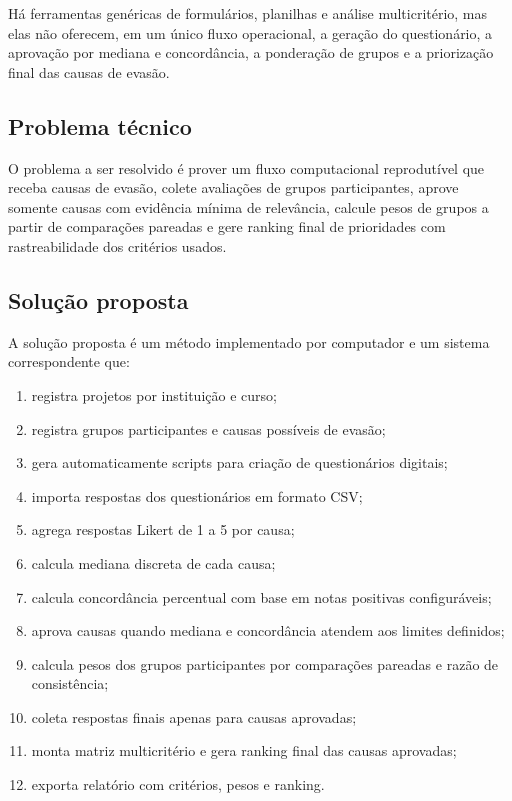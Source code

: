 Há ferramentas genéricas de formulários, planilhas e análise multicritério, mas elas não oferecem, em um único fluxo operacional, a geração do questionário, a aprovação por mediana e concordância, a ponderação de grupos e a priorização final das causas de evasão.

\subsection{Problema técnico}

O problema a ser resolvido é prover um fluxo computacional reprodutível que receba causas de evasão, colete avaliações de grupos participantes, aprove somente causas com evidência mínima de relevância, calcule pesos de grupos a partir de comparações pareadas e gere ranking final de prioridades com rastreabilidade dos critérios usados.

\subsection{Solução proposta}

A solução proposta é um método implementado por computador e um sistema correspondente que:

\begin{enumerate}
  \item registra projetos por instituição e curso;
  \item registra grupos participantes e causas possíveis de evasão;
  \item gera automaticamente scripts para criação de questionários digitais;
  \item importa respostas dos questionários em formato CSV;
  \item agrega respostas Likert de 1 a 5 por causa;
  \item calcula mediana discreta de cada causa;
  \item calcula concordância percentual com base em notas positivas configuráveis;
  \item aprova causas quando mediana e concordância atendem aos limites definidos;
  \item calcula pesos dos grupos participantes por comparações pareadas e razão de consistência;
  \item coleta respostas finais apenas para causas aprovadas;
  \item monta matriz multicritério e gera ranking final das causas aprovadas;
  \item exporta relatório com critérios, pesos e ranking.
\end{enumerate}


